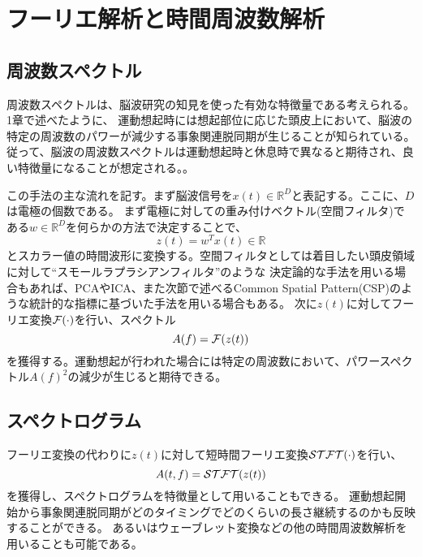 
\section{フーリエ解析と時間周波数解析}

\subsection{周波数スペクトル}
周波数スペクトルは、脳波研究の知見を使った有効な特徴量である考えられる。
1章で述べたように、
運動想起時には想起部位に応じた頭皮上において、脳波の特定の周波数のパワーが減少する事象関連脱同期が生じることが知られている。
従って、脳波の周波数スペクトルは運動想起時と休息時で異なると期待され、良い特徴量になることが想定される。\cite{erd}。

この手法の主な流れを記す。まず脳波信号を\(x(t) \in \mathbb{R}^D\)と表記する。ここに、\(D\)は電極の個数である。
まず電極に対しての重み付けベクトル(空間フィルタ)である$w \in \mathbb{R}^D$を何らかの方法で決定することで、
\begin{equation}
    z(t) = w^T x(t) \in \mathbb{R}    
\end{equation}
とスカラー値の時間波形に変換する。空間フィルタとしては着目したい頭皮領域に対して``スモールラプラシアンフィルタ''のような
決定論的な手法を用いる場合もあれば、PCAやICA、また次節で述べるCommon Spatial Pattern(CSP)のような統計的な指標に基づいた手法を用いる場合もある。
次に$z(t)$に対してフーリエ変換${\cal F}(\cdot)$を行い、スペクトル
\begin{equation}
    A(f) = {\cal F}(z(t))
\end{equation}
を獲得する。運動想起が行われた場合には特定の周波数において、パワースペクトル\(A(f)^2\)の減少が生じると期待できる。

\subsection{スペクトログラム}
フーリエ変換の代わりに$z(t)$に対して短時間フーリエ変換${\cal STFT}(\cdot)$を行い、
\begin{equation}
    A(t,f) = {\cal STFT}(z(t))
\end{equation}
を獲得し、スペクトログラムを特徴量として用いることもできる。
運動想起開始から事象関連脱同期がどのタイミングでどのくらいの長さ継続するのかも反映することができる。
あるいはウェーブレット変換などの他の時間周波数解析を用いることも可能である。